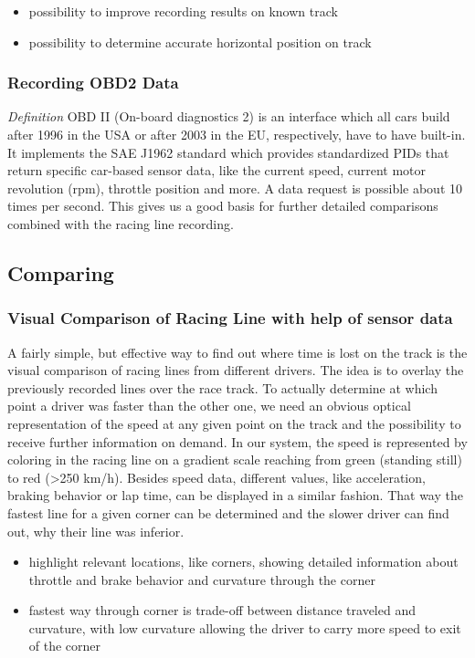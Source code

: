 \begin{itemize}
  \item possibility to improve recording results on known track
  \item possibility to determine accurate horizontal position on track
\end{itemize}

\subsubsection{Recording OBD2 Data}
\textit{Definition} OBD II (On-board diagnostics 2) is an interface which all cars build after 1996 in the USA or after 2003 in the EU, respectively, have to have built-in. It implements the SAE J1962 standard which provides standardized PIDs that return specific car-based sensor data, like the current speed, current motor revolution (rpm), throttle position and more.
A data request is possible about 10 times per second. This gives us a good basis for further detailed comparisons combined with the racing line recording.

\subsection{Comparing}
\subsubsection{Visual Comparison of Racing Line with help of sensor data}
A fairly simple, but effective way to find out where time is lost on the track is the visual comparison of racing lines from different drivers. The idea is to overlay the previously recorded lines over the race track. To actually determine at which point a driver was faster than the other one, we need an obvious optical representation of the speed at any given point on the track and the possibility to receive further information on demand.
In our system, the speed is represented by coloring in the racing line on a gradient scale reaching from green (standing still) to red (>250 km/h).
Besides speed data, different values, like acceleration, braking behavior or lap time, can be displayed in a similar fashion. That way the fastest line for a given corner can be determined and the slower driver can find out, why their line was inferior.

\begin{itemize}
  \item highlight relevant locations, like corners, showing detailed information about throttle and brake behavior and curvature through the corner
  \item fastest way through corner is trade-off between distance traveled and curvature, with low curvature allowing the driver to carry more speed to exit of the corner
\end{itemize}

